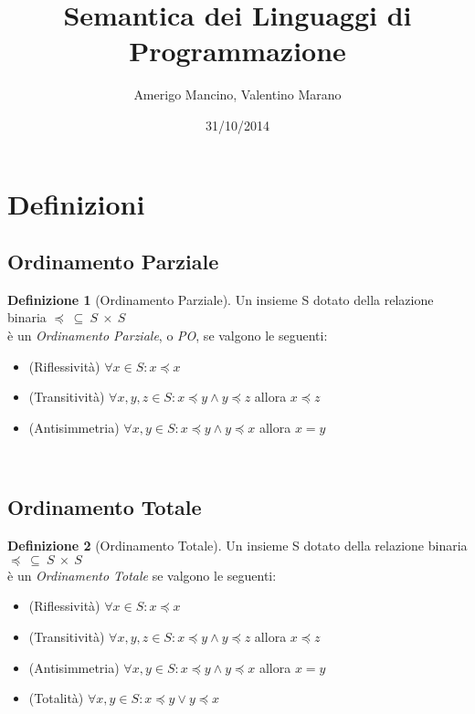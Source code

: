 \documentclass[a4paper, 10pt]{article} %
\begin{document}
\frenchspacing %

\title{Semantica dei Linguaggi di Programmazione}
\author{Amerigo Mancino, Valentino Marano}
\date{31/10/2014}

\maketitle %

\tableofcontents
\newpage

\section{Definizioni}

\theoremstyle{definition}
\newtheorem{definizione}{Definizione}

\subsection{Ordinamento Parziale}
\begin{definizione}[Ordinamento Parziale]
  Un insieme S dotato della relazione binaria $\preceq\ \subseteq\ S\ \times\ S$\\
  è un \emph{Ordinamento Parziale}, o \emph{PO}, se valgono le seguenti:
  \begin{itemize}
  \item (Riflessività) $ \forall x \in S : x \preceq x $
  \item (Transitività) $ \forall x,y,z \in S : x \preceq y \land y \preceq z $ allora $ x \preceq z $
  \item (Antisimmetria) $ \forall x,y \in S : x \preceq y \land y \preceq x $ allora $ x = y $
  \end{itemize}
\end{definizione}

\
\subsection{Ordinamento Totale}
\begin{definizione}[Ordinamento Totale]
  Un insieme S dotato della relazione binaria $\preceq\ \subseteq\ S\ \times\ S$\\
  è un \emph{Ordinamento Totale} se valgono le seguenti:
  \begin{itemize}
  \item (Riflessività) $ \forall x \in S : x \preceq x $
  \item (Transitività) $ \forall x,y,z \in S : x \preceq y \land y \preceq z $ allora $ x \preceq z $
  \item (Antisimmetria) $ \forall x,y \in S : x \preceq y \land y \preceq x $ allora $ x = y $
  \item (Totalità) $ \forall x,y \in S : x \preceq y \lor y \preceq x $
  \end{itemize}
\end{definizione}
\end{document}
